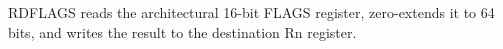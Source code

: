 RDFLAGS reads the architectural 16-bit FLAGS register, zero-extends it to 64 bits, and writes the result to the destination Rn register.
